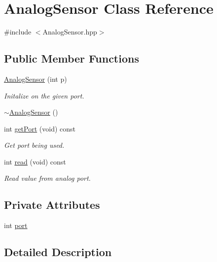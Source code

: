 \hypertarget{class_analog_sensor}{}\section{Analog\+Sensor Class Reference}
\label{class_analog_sensor}


{\ttfamily \#include $<$Analog\+Sensor.\+hpp$>$}

\subsection*{Public Member Functions}
\begin{DoxyCompactItemize}
\item 
\hyperlink{class_analog_sensor_a89c27a846f86896780cf1a9769f4c8b7}{Analog\+Sensor} (int p)
\begin{DoxyCompactList}\small\item\em Initalize on the given port. \end{DoxyCompactList}\item 
\hyperlink{class_analog_sensor_a4b88bf9ee03c180dedea7822e5d32997}{$\sim$\+Analog\+Sensor} ()
\item 
int \hyperlink{class_analog_sensor_a21ce4f0e9917b0ab1a245c590b3ec7d7}{get\+Port} (void) const
\begin{DoxyCompactList}\small\item\em Get port being used. \end{DoxyCompactList}\item 
int \hyperlink{class_analog_sensor_ab3d8aa72dcadbdc023e6a55a49885eb8}{read} (void) const
\begin{DoxyCompactList}\small\item\em Read value from analog port. \end{DoxyCompactList}\end{DoxyCompactItemize}
\subsection*{Private Attributes}
\begin{DoxyCompactItemize}
\item 
int \hyperlink{class_analog_sensor_a4897b9d41db1368ecc600a43547580f7}{port}
\end{DoxyCompactItemize}


\subsection{Detailed Description}


